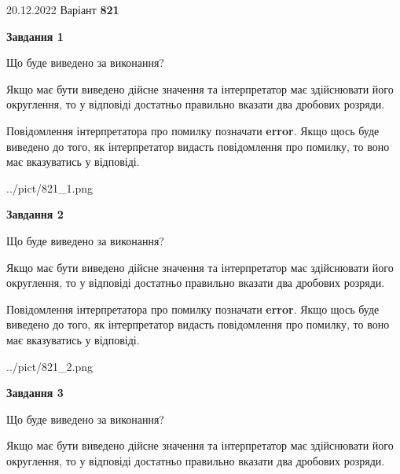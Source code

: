 \documentclass[12pt, ukrainian]{article}
\begin{document}
{20.12.2022 Варіант \No \textbf { 821 }\par}
{
\begin {Large}

{\begin {center}\textbf{Завдання 1}\end {center}}\par
Що буде виведено за виконання? \par

Якщо має бути виведено дійсне значення та інтерпретатор має здійснювати його округлення, 
то у відповіді достатньо правильно вказати два дробових розряди.

Повідомлення інтерпретатора про помилку позначати \textbf{error}.
Якщо щось буде виведено до того, як інтерпретатор видасть повідомлення про помилку, 
то воно має вказуватись у відповіді. \par

\begin{center}
	{../pict/821_1.png}
\end{center}
\newpage

{\begin {center}\textbf{Завдання 2}\end {center}}\par
Що буде виведено за виконання? \par

Якщо має бути виведено дійсне значення та інтерпретатор має здійснювати його округлення, 
то у відповіді достатньо правильно вказати два дробових розряди.

Повідомлення інтерпретатора про помилку позначати \textbf{error}.
Якщо щось буде виведено до того, як інтерпретатор видасть повідомлення про помилку, 
то воно має вказуватись у відповіді. \par

\begin{center}
	{../pict/821_2.png}
\end{center}
\newpage

{\begin {center}\textbf{Завдання 3}\end {center}}\par
Що буде виведено за виконання? \par

Якщо має бути виведено дійсне значення та інтерпретатор має здійснювати його округлення, 
то у відповіді достатньо правильно вказати два дробових розряди.


\end{Large}}
\end{document}

